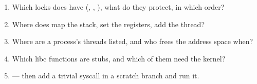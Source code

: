 \begin{infobox}[title=\textbf{Before the interview: 15 minutes in the team repo}]
\begin{enumerate}
\item Which locks does  have (, , ), what do they protect, in which order?
\item Where does  map the stack, set the registers, add the thread?
\item Where are a process's threads listed, and who frees the address space when?
\item Which libc functions are stubs, and which of them need the kernel?
\item {} --- then add a trivial syscall in a scratch branch and run it.
\end{enumerate}
\end{infobox}
